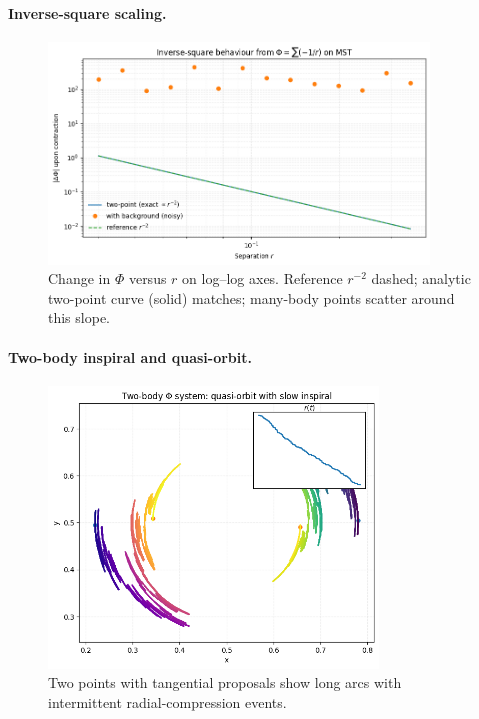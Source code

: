 \documentclass[aps,preprint,onecolumn,longbibliography,nofootinbib]{revtex4-2}
\numberwithin{equation}{section}        %
\begin{document}
\paragraph*{Inverse-square scaling.}
\begin{figure}[H]
\centering
\includegraphics[width=0.9\textwidth]{figures/inverse_square.png}
\caption{Change in $\Phi$ versus $r$ on log--log axes. Reference $r^{-2}$ dashed; analytic two-point curve (solid) matches; many-body points scatter around this slope.}
\label{fig:inverse}
\end{figure}

\paragraph*{Two-body inspiral and quasi-orbit.}
\begin{figure}[H]
\centering
\includegraphics[width=0.78\textwidth]{figures/orbit_two_body.png}
\caption{Two points with tangential proposals show long arcs with intermittent radial-compression events.}
\label{fig:twoorbit}
\end{figure}
\end{document}
